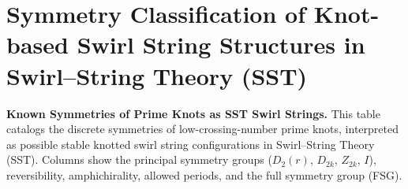 \documentclass{article}
\begin{document}
\section{Symmetry Classification of Knot-based Swirl String Structures in Swirl--String Theory (SST)}

    \begin{table}[H]
    \caption{
        \textbf{Known Symmetries of Prime Knots as SST Swirl Strings.}
        This table catalogs the discrete symmetries of low-crossing-number prime knots, interpreted as possible stable knotted swirl string configurations in Swirl--String Theory (SST). Columns show the principal symmetry groups ($D_2(r)$, $D_{2k}$, $Z_{2k}$, $I$), reversibility, amphichirality, allowed periods, and the full symmetry group (FSG).
    }
    \centering

    \renewcommand{\arraystretch}{1.15}
    \setlength{\tabcolsep}{0.45em}


\end{table}
\end{document}

